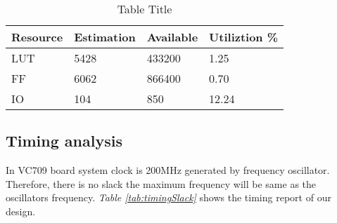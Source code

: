 \begin{table}[]
\begin{center}
\caption {Table Title} \label{tab:util2}
\begin{tabular}{|l|l|l|l|}
\hline
Resource & Estimation & Available & Utiliztion \% \\ \hline
LUT      & 5428       & 433200    & 1.25          \\
FF       & 6062       & 866400    & 0.70          \\
IO       & 104        & 850       & 12.24         \\ \hline
\end{tabular}
\end{center}
\end{table}



\subsection{Timing analysis}

In VC709 board system clock is 200MHz generated by frequency oscillator. Therefore, there is no slack  the maximum frequency will be same as the oscillators frequency. \textit{Table \ref{tab:timingSlack}} shows the timing report of our design. 


\begin{table}[]
\begin{center}
\caption {Table Title} \label{tab:timingSlack}
\end{center}
\end{table}






